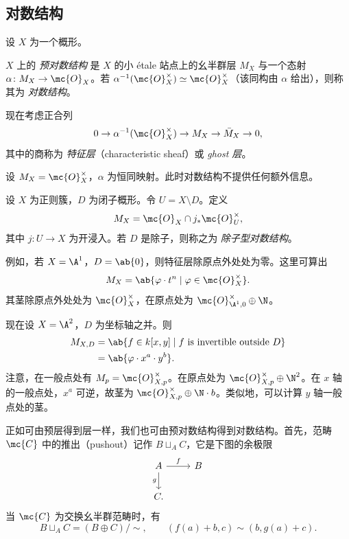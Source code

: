 \subsection{对数结构}%
\label{sub:Log structures}

设 \(X\) 为一个概形。
\begin{defn}
    \(X\) 上的 \textit{预对数结构} 是 \(X\) 的小 \'etale 站点上的幺半群层 \(M_X\) 与一个态射 \(\alpha \colon M_X \to \mc{O}_X\)。若 \(\alpha^{-1}(\mc{O}_X^{\times}) \simeq \mc{O}_X^{\times}\)（该同构由 \(\alpha\) 给出），则称其为 \textit{对数结构}。 
\end{defn}

现在考虑正合列
\[ 0 \to \alpha^{-1}(\mc{O}_X^{\times}) \to M_X \to \bar{M}_X \to 0, \]
其中的商称为 \textit{特征层}（characteristic sheaf）或 \textit{ghost 层}。

\begin{exm}
    设 \(M_X = \mc{O}_X^{\times}\)，\(\alpha\) 为恒同映射。此时对数结构不提供任何额外信息。
\end{exm}

\begin{exm}
    设 \(X\) 为正则簇，\(D\) 为闭子概形。令 \(U = X \setminus D\)。定义
    \[ M_X = \mc{O}_X \cap j_* \mc{O}_U^{\times}, \]
    其中 \(j \colon U \to X\) 为开浸入。若 \(D\) 是除子，则称之为 \textit{除子型对数结构}。

    例如，若 \(X = \A^1\)，\(D = \ab\{0\}\)，则特征层除原点外处处为零。这里可算出
    \[ M_X = \ab\{ \varphi \cdot t^n \mid \varphi \in \mc{O}_X^{\times} \}. \]
    其茎除原点外处处为 \(\mc{O}_X^{\times}\)，在原点处为 \(\mc{O}_{\A^1, 0}^{\times} \oplus \N\)。
\end{exm}

\begin{exm}
    现在设 \(X = \A^2\)，\(D\) 为坐标轴之并。则
    \begin{align*}
        M_{X,D} &= \ab\{f \in k[x,y] \mid f \text{ is invertible outside } D \} \\
        &= \ab\{\varphi \cdot x^a \cdot y^b\}.
    \end{align*}
    注意，在一般点处有 \(M_p = \mc{O}_{X,p}^{\times}\)。在原点处为 \(\mc{O}_{X,p}^{\times}\oplus \N^2\)。在 \(x\) 轴的一般点处，\(x^a\) 可逆，故茎为 \(\mc{O}_{X,p}^{\times}\oplus \N \cdot b\)。类似地，可以计算 \(y\) 轴一般点处的茎。   
\end{exm}

正如可由预层得到层一样，我们也可由预对数结构得到对数结构。首先，范畴 \(\mc{C}\) 中的推出（pushout）记作 \(B \sqcup_A C\)，它是下图的余极限
\begin{equation*}
\begin{tikzcd}
    A \ar{r}{f} \ar{d}[swap]{g} & B \\
    C.
\end{tikzcd}
\end{equation*}
当 \(\mc{C}\) 为交换幺半群范畴时，有
\[ B \sqcup_A C = (B \oplus C)/\sim, \qquad (f(a) + b, c) \sim (b, g(a)+c). \]

